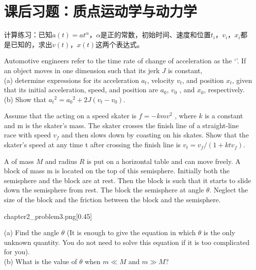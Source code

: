 \section{课后习题：质点运动学与动力学}
\begin{example}
    计算练习：已知$a(t)=at^{\alpha }$，$\alpha$是正的常数，初始时间、速度和位置$t_{i}$，$v_{i}$，$x_{i}$都是已知的，求出$v(t)$，$x(t)$这两个表达式。
\end{example}
\begin{example}
    Automotive engineers refer to the time rate of change
    of acceleration as the `'. If an object moves in one dimension such that its jerk $J$ is constant,\\
    (a) determine expressions for its acceleration $a_{t}$, velocity $v_{t}$, and position $x_{t}$, given that its initial acceleration, speed, and position are $a_{0}$, $ v_{0} $ , and $x_{0}$, respectively.\\
    (b) Show that $ a_{t}{}^ {2} = a_{0}{}^ {2}  +2J(  v_ {t}  -  v_ {0}  )$.
\end{example}

\begin{example}
    Assume that the  acting on a speed skater
    is $f=- kmv^ {2} $ , where $k$ is a constant and m is the skater's
    mass. The skater crosses the finish line of a straight-line
    race with speed $ v_ {f } $ and then slows down by coasting on
    his skates. Show that the skater's speed at any time t
    after crossing the finish line is $v_{t} = v_ {f}  / (1+  ktv_ {f}  )$.

\end{example}

\begin{example}
    A  of mass $M$ and radius $R$ is put on a  horizontal table and can move freely.
    A block of mass m is located on the top of this semisphere.
    Initially both the semisphere and the block are at rest.
    Then the block is  such that it starts to slide down the semisphere from rest.
    The block  the semisphere at angle $\theta$.
    Neglect the size of the block and the friction between the block and the semisphere.

    \begin{singlefigure}[第四题图]{chapter2_problem3.png}[0.45]
    \end{singlefigure}

    (a) Find the angle $\theta$ (It is enough to give the equation in which $\theta$ is the only unknown quantity. You do not need to solve this equation if it is too complicated for you).\\
    (b) What is the value of $\theta$ when $m \ll M$ and $m \gg M$?
\end{example}

